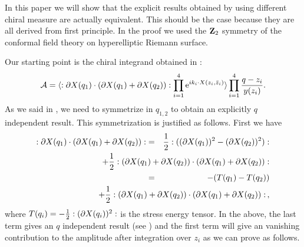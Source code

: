 \documentclass[a4paper,12pt]{article}
\begin{document}
In this paper we will show that the explicit results obtained by
using different chiral measure are actually equivalent. This
should be the case because they are all derived from first
principle. In the proof we used the ${\bf Z}_2$ symmetry of the
conformal field theory on hyperelliptic Riemann surface.

Our starting point is the chiral integrand obtained in
\cite{AllZhu3}:
\begin{equation}
{\cal A} = \langle : \partial X(q_1) \cdot (
\partial X(q_1) +
\partial X(q_2) ) : \prod_{i=1}^4 \hbox{e}^{i k_i \cdot X(z_i, \bar
z_i)} \rangle  \prod_{i=1}^4 { q -z_i\over y(z_i) } .
\end{equation}
As we said in \cite{AllZhu3}, we need to symmetrize in $q_{1,2}$
to obtain an explicitly $q$ independent result. This
symmetrization is justified as follows. First we have
\begin{eqnarray}
: \partial X(q_1) \cdot (
\partial X(q_1) +
\partial X(q_2) ) : & = &   {1\over 2}: ( (\partial X(q_1))^2
- (\partial X(q_2) )^2) :\nonumber \\
& & \hskip -4cm + {1 \over 2} :( \partial X(q_1) +
\partial X(q_2) ) \cdot ( \partial X(q_1) + \partial X(q_2) ) :
\nonumber \\
& = &  -(T(q_1) - T(q_2) )  \nonumber \\
& & \hskip -4cm + {1 \over 2} :( \partial X(q_1) +
\partial X(q_2) ) \cdot ( \partial X(q_1) + \partial X(q_2) ) : \,
,
\end{eqnarray}
where $T(q_i)= - { 1\over 2} :(\partial X(q_i))^2:$ is the stress
energy tensor. In the above, the last  term gives an $q$
independent result (see \cite{AllZhu3}) and the first  term will
give an vanishing contribution to the amplitude after integration
over $z_i$ as we can prove as follows.
\end{document}
